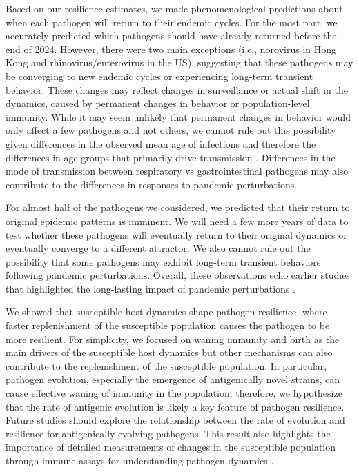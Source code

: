 \documentclass[12pt]{article}
\begin{document}
Based on our resilience estimates, we made phenomenological predictions about when each pathogen will return to their endemic cycles.
For the most part, we accurately predicted which pathogens should have already returned before the end of 2024.
However, there were two main exceptions (i.e., norovirus in Hong Kong and rhinovirus/enterovirus in the US), suggesting that these pathogens may be converging to new endemic cycles or experiencing long-term transient behavior.
These changes may reflect changes in surveillance or actual shift in the dynamics, caused by permanent changes in behavior or population-level immunity.
While it may seem unlikely that permanent changes in behavior would only affect a few pathogens and not others, we cannot rule out this possibility given differences in the observed mean age of infections and therefore the differences in age groups that primarily drive transmission \citep{radin2014epidemiology,lv2024epidemiological}.
Differences in the mode of transmission between respiratory vs gastrointestinal pathogens may also contribute to the differences in responses to pandemic perturbations.

For almost half of the pathogens we considered, we predicted that their return to original epidemic patterns is imminent.
We will need a few more years of data to test whether these pathogens will eventually return to their original dynamics or eventually converge to a different attractor.
We also cannot rule out the possibility that some pathogens may exhibit long-term transient behaviors following pandemic perturbations.
Overall, these observations echo earlier studies that highlighted the long-lasting impact of pandemic perturbations \citep{baker2022long,caini2024probable,chen2024covid,park2024predicting,nielsen2025complex}. 

We showed that susceptible host dynamics shape pathogen resilience, where faster replenishment of the susceptible population causes the pathogen to be more resilient.
For simplicity, we focused on waning immunity and birth as the main drivers of the susceptible host dynamics but other mechanisms can also contribute to the replenishment of the susceptible population.
In particular, pathogen evolution, especially the emergence of antigenically novel strains, can cause effective waning of immunity in the population;
therefore, we hypothesize that the rate of antigenic evolution is likely a key feature of pathogen resilience.
Future studies should explore the relationship between the rate of evolution and resilience for antigenically evolving pathogens.
This result also highlights the importance of detailed measurements of changes in the susceptible population through immune assays for understanding pathogen dynamics \citep{nguyen2022enterovirus}.
\end{document}
